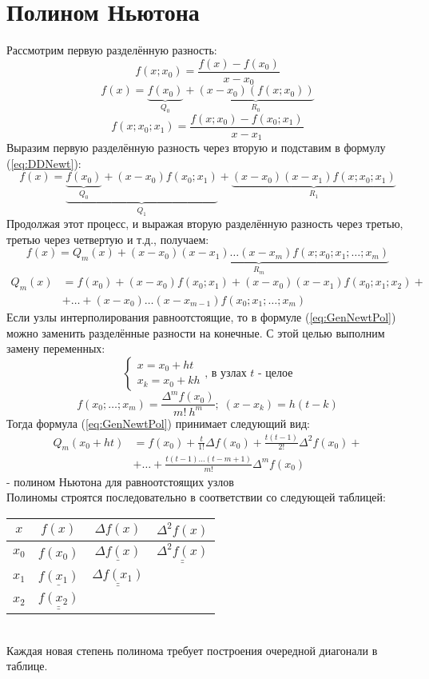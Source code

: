 \documentclass[a4paper,11pt]{article}
\begin{document}
\section{Полином Ньютона}
Рассмотрим первую разделённую разность:
\[f(x; x_0) = \frac{f(x) - f(x_0)}{x - x_0}\]
\begin{equation}
  f(x) = \underbrace{f(x_0)}_{Q_0} + \underbrace{(x - x_0)(f(x; x_0))}_{R_0}
  \label{eq:DDNewt}
\end{equation}
\[f(x; x_0; x_1) = \frac{f(x; x_0) - f(x_0; x_1)}{x - x_1}\]
Выразим первую разделённую разность через вторую и подставим в формулу (\ref{eq:DDNewt}):
\[f(x) = \underbrace{\underbrace{f(x_0)}_{Q_0} + (x - x_0)f(x_0; x_1)}_{Q_1} + \underbrace{(x - x_0)(x - x_1)f(x; x_0; x_1)}_{R_1}\]
Продолжая этот процесс, и выражая вторую разделённую разность через третью, третью через четвертую и т.д., получаем:
\[f(x) = Q_m(x) + \underbrace{(x - x_0)(x - x_1)\dots(x - x_m)f(x; x_0; x_1; \dots; x_m)}_{R_m}\]
\begin{equation}
  \begin{aligned}
    Q_m(x) &= f(x_0) + (x - x_0)f(x_0; x_1) + (x - x_0)(x - x_1)f(x_0; x_1; x_2) +\\
           & + \dots + (x - x_0)\dots(x - x_{m-1})f(x_0; x_1; \dots; x_m)
  \end{aligned}
  \label{eq:GenNewtPol}
\end{equation}
Если узлы интерполирования равноотстоящие, то в формуле (\ref{eq:GenNewtPol}) можно заменить разделённые разности на конечные. С этой целью выполним замену переменных:
\begin{equation*}
  \begin{cases}
    x = x_0 + ht \\
    x_k = x_0 + kh
  \end{cases}, \, \text{в узлах $t$ - целое}
\end{equation*}
\[f(x_0; \dots; x_m) = \frac{\Delta^mf(x_0)}{m!\ h^m}; \; (x - x_k) = h(t - k)\]
Тогда формула (\ref{eq:GenNewtPol}) принимает следующий вид:
\begin{align*}
  Q_m(x_0 + ht) &= f(x_0) + \frac{t}{1!}\Delta f(x_0) + \frac{t(t-1)}{2!}\Delta^2f(x_0) + \\
                & + \dots + \frac{t(t-1)\dots(t-m+1)}{m!}\Delta^mf(x_0)
\end{align*} - полином Ньютона для равноотстоящих узлов \\
\newpage
Полиномы строятся последовательно в соответствии со следующей таблицей: \\
\begin{tabular}{ c|c|c|c }
  $x$ & $f(x)$ & $\Delta f(x)$ & $\Delta^2f(x)$ \\
  \hline
  $x_0$ & $f(x_0)$ & $\underline{\Delta f(x)}$ & $\underline{\underline{\Delta^2f(x)}}$ \\
  $x_1$ & $\underline{f(x_1)}$ & $\underline{\underline{\Delta f(x_1)}}$ & \\
  $x_2$ & $\underline{\underline{f(x_2)}}$ & &
\end{tabular} \\
Каждая новая степень полинома требует построения очередной диагонали в таблице.
\end{document}
